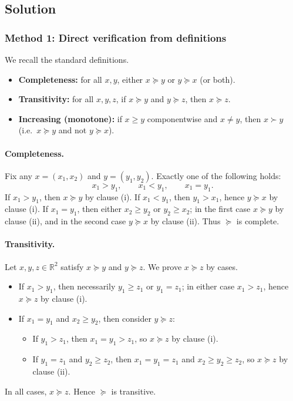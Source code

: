 \documentclass[12pt]{article}
\begin{document}
\subsection*{Solution}

\subsubsection*{Method 1: Direct verification from definitions}
We recall the standard definitions.

\begin{itemize}[leftmargin=*]
\item \textbf{Completeness:} for all \(x,y\), either \(x\succeq y\) or \(y\succeq x\) (or both).
\item \textbf{Transitivity:} for all \(x,y,z\), if \(x\succeq y\) and \(y\succeq z\), then \(x\succeq z\).
\item \textbf{Increasing (monotone):} if \(x\ge y\) componentwise and \(x\neq y\), then \(x\succ y\) (i.e.\ \(x\succeq y\) and not \(y\succeq x\)).
\end{itemize}

\paragraph{Completeness.}
Fix any \(x=(x_1,x_2)\) and \(y=(y_1,y_2)\). Exactly one of the following holds:
\[
x_1>y_1,\qquad x_1<y_1,\qquad x_1=y_1.
\]
If \(x_1>y_1\), then \(x\succeq y\) by clause (i).
If \(x_1<y_1\), then \(y_1>x_1\), hence \(y\succeq x\) by clause (i).
If \(x_1=y_1\), then either \(x_2\ge y_2\) or \(y_2\ge x_2\); in the first case \(x\succeq y\) by clause (ii), and in the second case \(y\succeq x\) by clause (ii).
Thus \(\succeq\) is complete.

\paragraph{Transitivity.}
Let \(x,y,z\in\mathbb{R}^2\) satisfy \(x\succeq y\) and \(y\succeq z\). We prove \(x\succeq z\) by cases.

\begin{itemize}[leftmargin=*]
\item If \(x_1>y_1\), then necessarily \(y_1\ge z_1\) or \(y_1=z_1\); in either case \(x_1>z_1\), hence \(x\succeq z\) by clause (i).
\item If \(x_1=y_1\) and \(x_2\ge y_2\), then consider \(y\succeq z\):
  \begin{itemize}[leftmargin=*]
  \item If \(y_1>z_1\), then \(x_1=y_1>z_1\), so \(x\succeq z\) by clause (i).
  \item If \(y_1=z_1\) and \(y_2\ge z_2\), then \(x_1=y_1=z_1\) and \(x_2\ge y_2\ge z_2\), so \(x\succeq z\) by clause (ii).
  \end{itemize}
\end{itemize}
In all cases, \(x\succeq z\). Hence \(\succeq\) is transitive.
\end{document}

